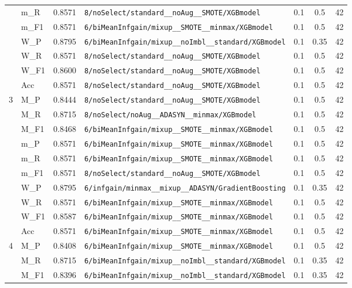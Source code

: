 \begin{table}[htbp]
\begin{tabular}{|c|l|c|>{\ttfamily\footnotesize}p{7.2cm}|c|c|c|}
 & m\_R & 0.8571 & \texttt{8/noSelect/standard\_\_noAug\_\_SMOTE/XGBmodel} & 0.1 & 0.5  & 42 \\ 
 & m\_F1 & 0.8571 & \texttt{6/biMeanInfgain/mixup\_\_SMOTE\_\_minmax/XGBmodel} & 0.1 & 0.5  & 42 \\ 
 & W\_P & 0.8795 & \texttt{6/biMeanInfgain/mixup\_\_noImbl\_\_standard/XGBmodel} & 0.1 & 0.35  & 42 \\ 
 & W\_R & 0.8571 & \texttt{8/noSelect/standard\_\_noAug\_\_SMOTE/XGBmodel} & 0.1 & 0.5  & 42 \\ 
 & W\_F1 & 0.8600 & \texttt{8/noSelect/standard\_\_noAug\_\_SMOTE/XGBmodel} & 0.1 & 0.5  & 42 \\ 
 & Acc & 0.8571 & \texttt{8/noSelect/standard\_\_noAug\_\_SMOTE/XGBmodel} & 0.1 & 0.5  & 42 \\ 
\hline
\multirow{10}{*}{3} & M\_P & 0.8444 & \texttt{8/noSelect/standard\_\_noAug\_\_SMOTE/XGBmodel} & 0.1 & 0.5  & 42 \\ 
 & M\_R & 0.8715 & \texttt{8/noSelect/noAug\_\_ADASYN\_\_minmax/XGBmodel} & 0.1 & 0.5  & 42 \\ 
 & M\_F1 & 0.8468 & \texttt{6/biMeanInfgain/mixup\_\_SMOTE\_\_minmax/XGBmodel} & 0.1 & 0.5  & 42 \\ 
 & m\_P & 0.8571 & \texttt{6/biMeanInfgain/mixup\_\_SMOTE\_\_minmax/XGBmodel} & 0.1 & 0.5  & 42 \\ 
 & m\_R & 0.8571 & \texttt{6/biMeanInfgain/mixup\_\_SMOTE\_\_minmax/XGBmodel} & 0.1 & 0.5  & 42 \\ 
 & m\_F1 & 0.8571 & \texttt{8/noSelect/standard\_\_noAug\_\_SMOTE/XGBmodel} & 0.1 & 0.5  & 42 \\ 
 & W\_P & 0.8795 & \texttt{6/infgain/minmax\_\_mixup\_\_ADASYN/GradientBoosting} & 0.1 & 0.35  & 42 \\ 
 & W\_R & 0.8571 & \texttt{6/biMeanInfgain/mixup\_\_SMOTE\_\_minmax/XGBmodel} & 0.1 & 0.5  & 42 \\ 
 & W\_F1 & 0.8587 & \texttt{6/biMeanInfgain/mixup\_\_SMOTE\_\_minmax/XGBmodel} & 0.1 & 0.5  & 42 \\ 
 & Acc & 0.8571 & \texttt{6/biMeanInfgain/mixup\_\_SMOTE\_\_minmax/XGBmodel} & 0.1 & 0.5  & 42 \\ 
\hline
\multirow{10}{*}{4} & M\_P & 0.8408 & \texttt{6/biMeanInfgain/mixup\_\_SMOTE\_\_minmax/XGBmodel} & 0.1 & 0.5  & 42 \\ 
 & M\_R & 0.8715 & \texttt{6/biMeanInfgain/mixup\_\_noImbl\_\_standard/XGBmodel} & 0.1 & 0.35  & 42 \\ 
 & M\_F1 & 0.8396 & \texttt{6/biMeanInfgain/mixup\_\_noImbl\_\_standard/XGBmodel} & 0.1 & 0.35  & 42 \\ 

\end{tabular}
\end{table}

